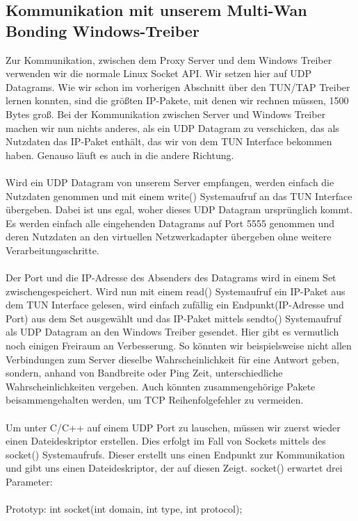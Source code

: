 \subsection{Kommunikation mit unserem Multi-Wan Bonding Windows-Treiber}
Zur Kommunikation, zwischen dem Proxy Server und dem Windows Treiber verwenden wir die normale Linux Socket API. Wir setzen hier auf UDP Datagrams. Wie wir schon im vorherigen Abschnitt über den TUN/TAP Treiber lernen konnten, sind die größten IP-Pakete, mit denen wir rechnen müssen, 1500 Bytes groß. Bei der Kommunikation zwischen Server und Windows Treiber machen wir nun nichts anderes, als ein UDP Datagram zu verschicken, das als Nutzdaten das IP-Paket enthält, das wir von dem TUN Interface bekommen haben. Genauso läuft es auch in die andere Richtung. 
\\\\
Wird ein UDP Datagram von unserem Server empfangen, werden einfach die Nutzdaten genommen und mit einem write() Systemaufruf an das TUN Interface übergeben. Dabei ist uns egal, woher dieses UDP Datagram ursprünglich kommt. Es werden einfach alle eingehenden Datagrams auf Port 5555 genommen und deren Nutzdaten an den virtuellen Netzwerkadapter übergeben ohne weitere Verarbeitungsschritte. 
\\\\
Der Port und die IP-Adresse des Absenders des Datagrams wird in einem Set zwischengespeichert. Wird nun mit einem read() Systemaufruf ein IP-Paket aus dem TUN Interface gelesen, wird einfach zufällig ein Endpunkt(IP-Adresse und Port) aus dem Set ausgewählt und das IP-Paket mittels sendto() Systemaufruf als UDP Datagram an den Windows Treiber gesendet. Hier gibt es vermutlich noch einigen Freiraum an Verbesserung. So könnten wir beispielsweise nicht allen Verbindungen zum Server dieselbe Wahrscheinlichkeit für eine Antwort geben, sondern, anhand von Bandbreite oder Ping Zeit, unterschiedliche Wahrscheinlichkeiten vergeben. Auch könnten zusammengehörige Pakete beisammengehalten werden, um TCP Reihenfolgefehler zu vermeiden.
\\\\
Um unter C/C++ auf einem UDP Port zu lauschen, müssen wir zuerst wieder einen Dateideskriptor erstellen. Dies erfolgt im Fall von Sockets mittels des socket() Systemaufrufs. Dieser erstellt uns einen Endpunkt zur Kommunikation und gibt uns einen Dateideskriptor, der auf diesen Zeigt. socket() erwartet drei Parameter:
\\\\
Prototyp: int socket(int domain, int type, int protocol);
